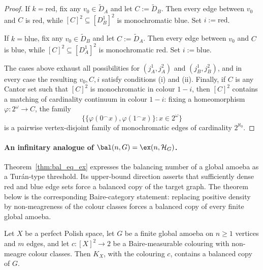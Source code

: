 \begin{proof}
    If $k=\mathrm{red}$, fix any $v_0\in\widetilde D_A$ and let $C:=\widetilde D_B$.
    Then every edge between $v_0$ and $C$ is red, while $[C]^2\subseteq [D_B^1]^2$ is monochromatic blue.
    Set $i:=\mathrm{red}$.
 
    If $k=\mathrm{blue}$, fix any $v_0\in\widetilde D_B$ and let $C:=\widetilde D_A$.
    Then every edge between $v_0$ and $C$ is blue, while $[C]^2\subseteq [D_A^1]^2$ is monochromatic red.
    Set $i:=\mathrm{blue}$.
 
    \medskip
    
    The cases above exhaust all possibilities for $(j_A^1,j_A^2)$ and $(j_B^1,j_B^2)$, and in every case the resulting $v_0,C,i$ satisfy conditions (i) and (ii).
    Finally, if $C$ is any Cantor set such that $[C]^2$ is monochromatic in colour $1-i$, then $[C]^2$ contains a matching of cardinality continuum in colour $1-i$: fixing a homeomorphism $\varphi\colon 2^\omega\to C$, the family $$\bigl\{\{\varphi(0^\frown x),\varphi(1^\frown x)\}:x\in 2^\omega\bigr\}$$ is a pairwise vertex-disjoint family of monochromatic edges of cardinality $2^{\aleph_0}$.
\end{proof}
 
\paragraph{An infinitary analogue of $\bal(n,G)=\ex(n,\mathcal H_G)$.}
 
Theorem~\ref{thm:bal_eq_ex} expresses the balancing number of a global amoeba as a Tur\'an-type threshold.
Its upper-bound direction asserts that sufficiently dense red and blue edge sets force a balanced copy of the target graph.
The theorem below is the corresponding Baire-category statement: replacing positive density by non-meagreness of the colour classes forces a balanced copy of every finite global amoeba.
 
\begin{theorem}\label{thm:inf_bal_eq_ex}
    Let $X$ be a perfect Polish space, let $G$ be a finite global amoeba on $n\geq 1$ vertices and $m$ edges, and let $c\colon[X]^2\to 2$ be a Baire-measurable colouring with non-meagre colour classes.
    Then $K_X$, with the colouring $c$, contains a balanced copy of $G$.
\end{theorem}
 
